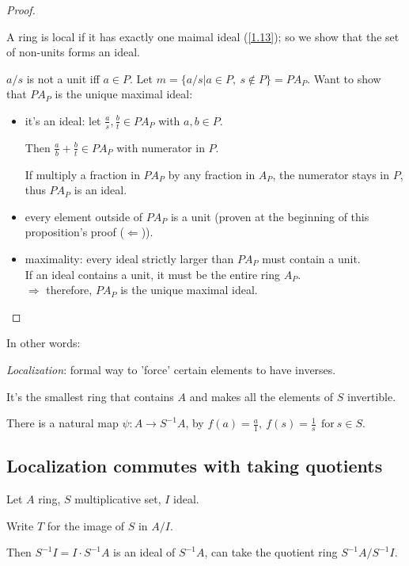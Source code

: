 \documentclass{article}
\theoremstyle{definition}
\begin{document}
\begin{proof}
\begin{enumerate}
      A ring is local if it has exactly one maimal ideal (\ref{1.13}); so we
      show that the set of non-units forms an ideal.

      $a/s$ is not a unit iff $a \in P$. Let $m= \{ a/s | a \in P,~ s \not\in P \} = PA_P$.
      Want to show that $PA_P$ is the unique maximal ideal:
      \begin{itemize}
        \item it's an ideal: let $\frac{a}{s}, \frac{b}{t} \in PA_P$ with $a,b \in P$.

          Then $\frac{a}{b} + \frac{b}{t} \in PA_P$ with numerator in $P$.

          If multiply a fraction in $PA_P$ by any fraction in $A_P$, the numerator stays in $P$, thus $PA_P$ is an ideal.

        \item every element outside of $PA_P$ is a unit (proven at the beginning of this proposition's proof ($\Longleftarrow$)).

        \item maximality: every ideal strictly larger than $PA_P$ must contain a unit.\\
          If an ideal contains a unit, it must be the entire ring $A_P$.\\
          \hspace*{2em}$\Longrightarrow$ therefore, $PA_P$ is the unique maximal ideal.
      \end{itemize}
  \end{enumerate}
\end{proof}


In other words:

\emph{Localization}: formal way to 'force' certain elements to have inverses.

It's the smallest ring that contains $A$ and makes all the elements of $S$ invertible.

There is a natural map $\psi: A \longrightarrow S^{-1}A$, by $f(a)=\frac{a}{1},~ f(s)=\frac{1}{s}~~ \text{for}~ s \in S$.


\subsection{Localization commutes with taking quotients}
Let $A$ ring, $S$ multiplicative set, $I$ ideal.

Write $T$ for the image of $S$ in $A/I$.

Then $S^{-1}I=I \cdot S^{-1}A$ is an ideal of $S^{-1}A$, can take the quotient ring $S^{-1}A / S^{-1} I$.
\end{document}
